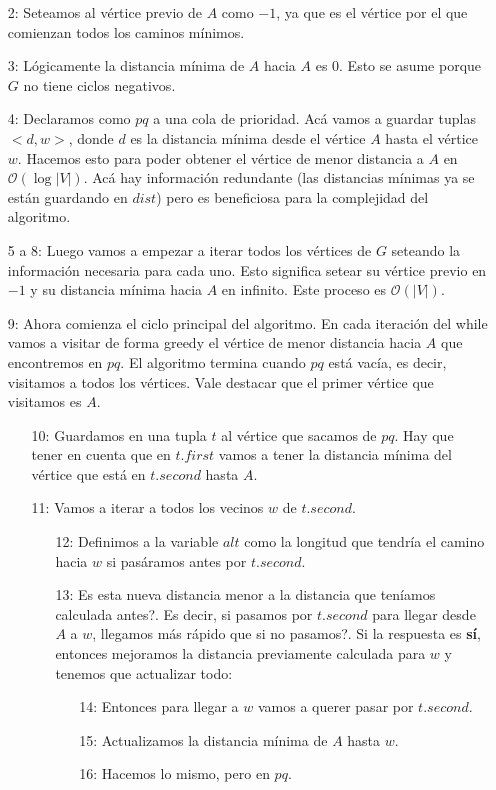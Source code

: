 \begin{enumerate}
\item [2:] Seteamos al v\'ertice previo de $A$ como $-1$, ya que es el v\'ertice por el que comienzan todos los caminos m\'inimos.
\item [3:] L\'ogicamente la distancia m\'inima de $A$ hacia $A$ es 0. Esto se asume porque $G$ no tiene ciclos negativos.
\item [4:] Declaramos como $pq$ a una cola de prioridad. Ac\'a vamos a guardar tuplas $<d, w>$, donde $d$ es la distancia m\'inima desde el v\'ertice $A$ hasta el v\'ertice $w$. Hacemos esto para poder obtener el v\'ertice de menor distancia a $A$ en $\mathcal{O}(\log{}|V|)$. Ac\'a hay informaci\'on redundante (las distancias m\'inimas ya se est\'an guardando en $dist$) pero es beneficiosa para la complejidad del algoritmo.
\item [5 a 8:] Luego vamos a empezar a iterar todos los v\'ertices de $G$ seteando la informaci\'on necesaria para cada uno. Esto significa setear su v\'ertice previo en $-1$ y su distancia m\'inima hacia $A$ en infinito. Este proceso es  $\mathcal{O}(|V|)$.
\item [9:] Ahora comienza el ciclo principal del algoritmo. En cada iteraci\'on del while vamos a visitar de forma greedy el v\'ertice de menor distancia hacia $A$ que encontremos en $pq$. El algoritmo termina cuando $pq$ est\'a vac\'ia, es decir, visitamos a todos los v\'ertices. Vale destacar que el primer v\'ertice que visitamos es $A$.
    \begin{enumerate}
    \item [10:] Guardamos en una tupla $t$ al v\'ertice que sacamos de $pq$. Hay que tener en cuenta que en $t.first$ vamos a tener la distancia m\'inima del v\'ertice que est\'a en $t.second$ hasta $A$.
    \item [11:] Vamos a iterar a todos los vecinos $w$ de $t.second$.
        \begin{enumerate}
        \item [12:] Definimos a la variable $alt$ como la longitud que tendr\'ia el camino hacia $w$ si pas\'aramos antes por $t.second$.
        \item [13:] \¿Es esta nueva distancia menor a la distancia que ten\'iamos calculada antes?. Es decir, \¿si pasamos por $t.second$ para llegar desde $A$ a $w$, llegamos m\'as r\'apido que si no pasamos?. Si la respuesta es \textbf{s\'i}, entonces mejoramos la distancia previamente calculada para $w$ y tenemos que actualizar todo:
            \begin{enumerate}
            \item [14:] Entonces para llegar a $w$ vamos a querer pasar por $t.second$.
            \item [15:] Actualizamos la distancia m\'inima de $A$ hasta $w$.
            \item [16:] Hacemos lo mismo, pero en $pq$.
            \end{enumerate}
        \end{enumerate}
    \end{enumerate}
\end{enumerate}

